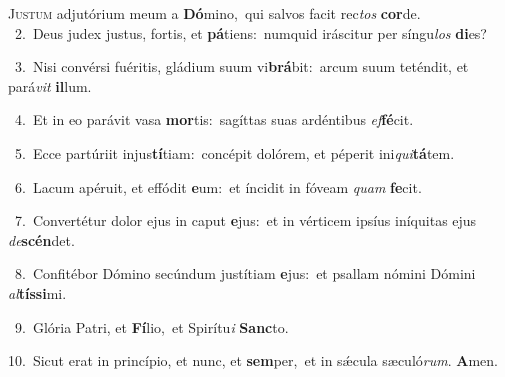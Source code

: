 \lettrine{\initial\textcolor{\initialcolor}{J}}{ustum} adjutórium meum a \textbf{Dó}\-mino,~\star qui salvos facit rec\textit{tos} \textbf{cor}\-de.\\
{\numbfont\textcolor{\numbcolor}{~2.}}~Deus judex justus, fortis, et \textbf{pá}\-tiens:~\star numquid iráscitur per síngu\textit{los} \textbf{di}\-es?\par
{\numbfont\textcolor{\numbcolor}{~3.}}~Nisi convérsi fuéritis, gládium suum vi\-\textbf{brá}\-bit:~\star arcum suum teténdit, et pará\textit{vit} \textbf{il}\-lum.\par
{\numbfont\textcolor{\numbcolor}{~4.}}~Et in eo parávit vasa \textbf{mor}\-tis:~\star sagíttas suas ardéntibus \textit{ef}\-\textbf{fé}cit.\par
{\numbfont\textcolor{\numbcolor}{~5.}}~Ecce partúriit injus\-\textbf{tí}\-tiam:~\star concépit dolórem, et péperit ini\-\textit{qui}\-\textbf{tá}tem.\par
{\numbfont\textcolor{\numbcolor}{~6.}}~Lacum apéruit, et effódit \textbf{e}\-um:~\star et íncidit in fóveam \textit{quam} \textbf{fe}\-cit.\par
{\numbfont\textcolor{\numbcolor}{~7.}}~Convertétur dolor ejus in caput \textbf{e}\-jus:~\star et in vérticem ipsíus iníquitas ejus \textit{de}\-\textbf{scén}det.\par
{\numbfont\textcolor{\numbcolor}{~8.}}~Confitébor Dómino secúndum justítiam \textbf{e}\-jus:~\star et psallam nómini Dómini \textit{al}\-\textbf{tís}\textbf{si}mi.\par
{\numbfont\textcolor{\numbcolor}{~9.}}~Glória Patri, et \textbf{Fí}\-lio,~\star et Spirítu\textit{i} \textbf{Sanc}\-to.\par
{\numbfont\textcolor{\numbcolor}{10.}}~Sicut erat in princípio, et nunc, et \textbf{sem}\-per,~\star et in sǽcula sæculó\-\textit{rum}\-. \textbf{A}\-men.\par
